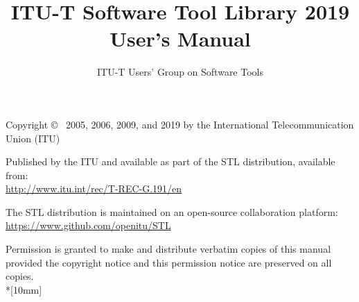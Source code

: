\documentclass[12pt,a4paper]{book}
\begin{document}
\SF

\def\sixsf{\footnotesize\tt}
\def\tenrm{\small\tt}
\def\twlsf{\sf}


\title{ITU-T Software Tool Library 2019 User's Manual}
\author{ITU-T Users' Group on Software Tools}

\maketitle
\thispagestyle{empty}


 Copyright \copyright~ 2005, 2006, 2009, and 2019 by the International
 Telecommunication Union (ITU)



Published by the ITU and available as part of the STL distribution, available from: \\
\url{http://www.itu.int/rec/T-REC-G.191/en}

The STL distribution is maintained on an open-source collaboration platform:\\
\url{https://www.github.com/openitu/STL}

Permission is granted to make and distribute verbatim copies of this manual provided the copyright notice and this permission notice are preserved on all copies.\\*[10mm]

\tableofcontents

\def\long{{\tt long}}

\cleardoublepage
{}
\setcounter{page}{1}



\end{document}
